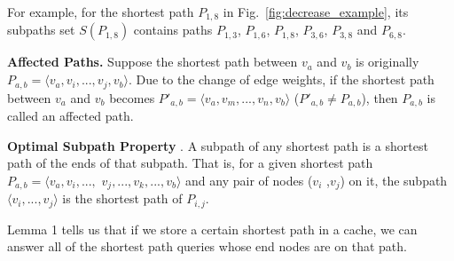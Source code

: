 For example, for the shortest path $P_{1,8}$ in Fig.~\ref{fig:decrease_example}, its subpaths set $S(P_{1,8})$ contains paths $P_{1,3}$, $P_{1,6}$, $P_{1,8}$, $P_{3,6}$, $P_{3,8}$ and $P_{6,8}$.


\begin{definition}
\label{def:Affected path}
{\textbf{Affected Paths.}} Suppose the shortest path between $v_a$ and $v_b$ is originally $P_{a,b}=\langle v_a,v_i,...,v_j,v_b\rangle$. Due to the change of edge weights, if the shortest path between $v_a$ and $v_b$ becomes $P'_{a,b}=\langle v_a,v_m,...,v_n,v_b\rangle$ ($P'_{a,b} \neq P_{a,b}$), then $P_{a,b}$ is called an affected path.
\end{definition}

\begin{lemma}
\label{lemmma:Optiaml subpath property}
{\textbf{Optimal Subpath Property}} \cite{cormen2001introduction}. A subpath of any shortest path is a shortest path of the ends of that subpath. That is, for a given shortest path $P_{a,b}=\langle v_{a}, v_{i}, ...,$ $ v_{j}, ...,v_{k},..., v_{b}\rangle$ and any pair of nodes ($v_{i}$ ,$v_{j}$) on it, the subpath $\langle v_{i},...,v_{j}\rangle$ is the shortest path of $P_{i,j}$.
\end{lemma}

Lemma 1 tells us that if we store a certain shortest path in a cache, we can answer all of the shortest path queries whose end nodes are on that path.

\mbox{}




